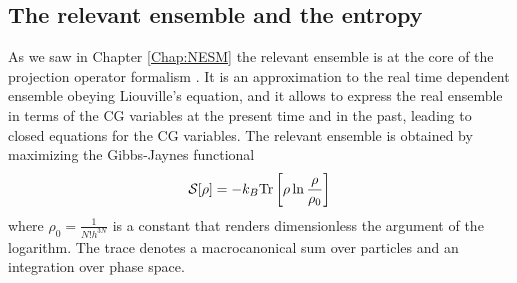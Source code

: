 \documentclass[b5paper,openright,11pt]{book}
\begin{document}
\begin{appendices}
\section{The relevant ensemble and the entropy}
As we saw in Chapter \ref{Chap:NESM}
the  relevant ensemble  is  at  the core  of  the projection  operator
formalism \cite{Grabert1982}. It is an  approximation to the real time
dependent  ensemble obeying  Liouville's  equation, and  it allows  to
express the real ensemble in terms  of the CG variables at the present
time and in the past, leading to closed equations for the CG variables.
The  relevant  ensemble is  obtained  by  maximizing the  Gibbs-Jaynes
functional
\begin{align}
  {\cal S}[\rho]=-k_B{\rm Tr}\left[\rho\ln\frac{\rho}{\rho_0}\right]
\end{align}
where   $\rho_0=\frac{1}{N!h^{3N}}$  is   a   constant  that   renders
dimensionless the argument of the  logarithm. The trace denotes
a macrocanonical sum over particles and an integration over phase space.


\end{appendices}
\end{document}
